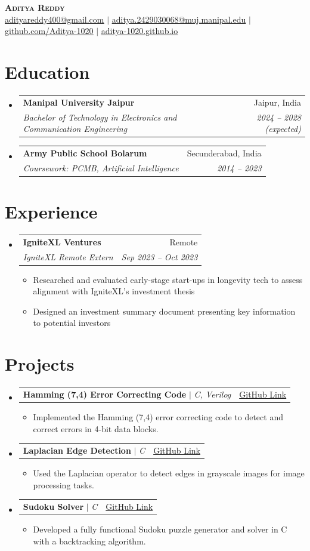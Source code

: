 \documentclass[letterpaper,11pt]{article}
\makeatletter
\newcommand{\resumeItem}[1]{
  \item\small{
    {#1 \vspace{-2pt}}
  }
}
\newcommand{\resumeSubheading}[4]{
  \vspace{-2pt}\item
    \begin{tabular*}{0.97\textwidth}[t]{l@{\extracolsep{\fill}}r}
      \textbf{#1} & #2 \\
      \textit{\small#3} & \textit{\small #4} \\
    \end{tabular*}\vspace{-7pt}
}
\newcommand{\resumeProjectHeading}[2]{
    \item
    \begin{tabular*}{0.97\textwidth}{l@{\extracolsep{\fill}}r}
      \small#1 & #2 \\
    \end{tabular*}\vspace{-7pt}
}
\newcommand{\resumeSubHeadingListStart}{\begin{itemize}[leftmargin=0.15in, label={}]}
\newcommand{\resumeSubHeadingListEnd}{\end{itemize}}
\newcommand{\resumeItemListStart}{\begin{itemize}}
\newcommand{\resumeItemListEnd}{\end{itemize}\vspace{-5pt}}
\makeatother
\begin{document}
\begin{center}
    \textbf{\Huge \scshape Aditya Reddy} \\ \vspace{1pt}
    \small \href{mailto:adityareddy400@gmail.com}{\underline{adityareddy400@gmail.com}} $|$ 
    \href{mailto:aditya.2429030068@muj.manipal.edu}{\underline{aditya.2429030068@muj.manipal.edu}} $|$
    \href{https://github.com/Aditya-1020}{\underline{github.com/Aditya-1020}} $|$
    \href{https://aditya-1020.github.io}{\underline{aditya-1020.github.io}}
\end{center}

\section{Education}
  \resumeSubHeadingListStart
    \resumeSubheading
      {Manipal University Jaipur}{Jaipur, India}
      {Bachelor of Technology in Electronics and Communication Engineering}{2024 -- 2028 (expected)}
    \resumeSubheading
      {Army Public School Bolarum}{Secunderabad, India}
      {Coursework: PCMB, Artificial Intelligence}{2014 -- 2023}
  \resumeSubHeadingListEnd

\section{Experience}
  \resumeSubHeadingListStart

    \resumeSubheading
      {IgniteXL Ventures}{Remote}
      {IgniteXL Remote Extern}{Sep 2023 -- Oct 2023}
      \resumeItemListStart
        \resumeItem{Researched and evaluated early-stage start-ups in longevity tech to assess alignment with IgniteXL’s investment thesis}
        \resumeItem{Designed an investment summary document presenting key information to potential investors}
      \resumeItemListEnd

  \resumeSubHeadingListEnd

\section{Projects}
  \resumeSubHeadingListStart
    \resumeProjectHeading
        {\textbf{Hamming (7,4) Error Correcting Code} $|$ \emph{C, Verilog}}{\href{https://github.com/Aditya-1020/Hamming_7-4}{GitHub Link}}
        \resumeItemListStart
          \resumeItem{Implemented the Hamming (7,4) error correcting code to detect and correct errors in 4-bit data blocks.}
        \resumeItemListEnd
    \resumeProjectHeading
        {\textbf{Laplacian Edge Detection} $|$ \emph{C}}{\href{https://github.com/Aditya-1020/Laplacian-edge}{GitHub Link}}
        \resumeItemListStart
          \resumeItem{Used the Laplacian operator to detect edges in grayscale images for image processing tasks.}
        \resumeItemListEnd
    \resumeProjectHeading
        {\textbf{Sudoku Solver} $|$ \emph{C}}{\href{https://github.com/Aditya-1020/sudoku_solver}{GitHub Link}}
        \resumeItemListStart
          \resumeItem{Developed a fully functional Sudoku puzzle generator and solver in C with a backtracking algorithm.}
        \resumeItemListEnd
  \resumeSubHeadingListEnd
\end{document}
